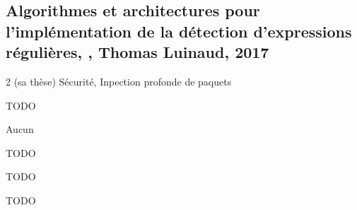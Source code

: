 
\subsection{Algorithmes et architectures pour l'implémentation de la détection d'expressions régulières, \cite{luinaud_algorithmes_2017}, Thomas Luinaud, 2017}
 2 (sa thèse)
 Sécurité, Inpection profonde de paquets

 TODO

 Aucun

 TODO

 TODO

 TODO

\clearpage
